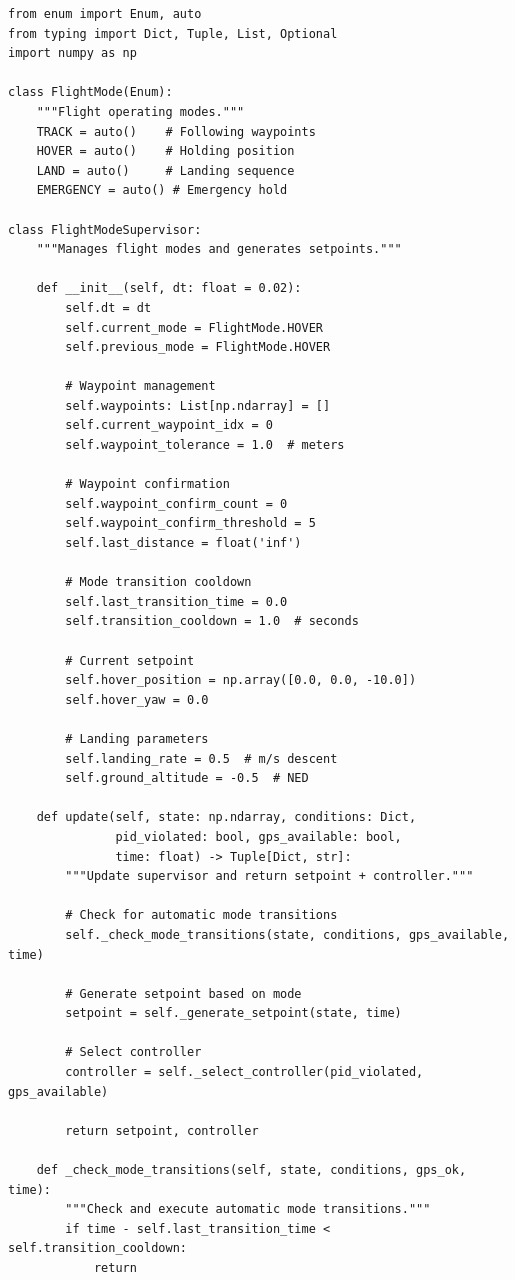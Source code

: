 \begin{lstlisting}[caption={Flight mode supervisor (flight\_mode\_supervisor.py)}, label=lst:supervisor]
from enum import Enum, auto
from typing import Dict, Tuple, List, Optional
import numpy as np

class FlightMode(Enum):
    """Flight operating modes."""
    TRACK = auto()    # Following waypoints
    HOVER = auto()    # Holding position
    LAND = auto()     # Landing sequence
    EMERGENCY = auto() # Emergency hold

class FlightModeSupervisor:
    """Manages flight modes and generates setpoints."""

    def __init__(self, dt: float = 0.02):
        self.dt = dt
        self.current_mode = FlightMode.HOVER
        self.previous_mode = FlightMode.HOVER

        # Waypoint management
        self.waypoints: List[np.ndarray] = []
        self.current_waypoint_idx = 0
        self.waypoint_tolerance = 1.0  # meters

        # Waypoint confirmation
        self.waypoint_confirm_count = 0
        self.waypoint_confirm_threshold = 5
        self.last_distance = float('inf')

        # Mode transition cooldown
        self.last_transition_time = 0.0
        self.transition_cooldown = 1.0  # seconds

        # Current setpoint
        self.hover_position = np.array([0.0, 0.0, -10.0])
        self.hover_yaw = 0.0

        # Landing parameters
        self.landing_rate = 0.5  # m/s descent
        self.ground_altitude = -0.5  # NED

    def update(self, state: np.ndarray, conditions: Dict,
               pid_violated: bool, gps_available: bool,
               time: float) -> Tuple[Dict, str]:
        """Update supervisor and return setpoint + controller."""

        # Check for automatic mode transitions
        self._check_mode_transitions(state, conditions, gps_available, time)

        # Generate setpoint based on mode
        setpoint = self._generate_setpoint(state, time)

        # Select controller
        controller = self._select_controller(pid_violated, gps_available)

        return setpoint, controller

    def _check_mode_transitions(self, state, conditions, gps_ok, time):
        """Check and execute automatic mode transitions."""
        if time - self.last_transition_time < self.transition_cooldown:
            return


\end{lstlisting}
